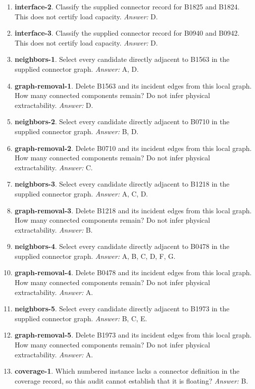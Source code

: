 \begin{enumerate}
\item \textbf{interface-2}. Classify the supplied connector record for B1825 and B1824. This does not certify load capacity. \textit{Answer:} D.
\item \textbf{interface-3}. Classify the supplied connector record for B0940 and B0942. This does not certify load capacity. \textit{Answer:} D.
\item \textbf{neighbors-1}. Select every candidate directly adjacent to B1563 in the supplied connector graph. \textit{Answer:} A, D.
\item \textbf{graph-removal-1}. Delete B1563 and its incident edges from this local graph. How many connected components remain? Do not infer physical extractability. \textit{Answer:} D.
\item \textbf{neighbors-2}. Select every candidate directly adjacent to B0710 in the supplied connector graph. \textit{Answer:} B, D.
\item \textbf{graph-removal-2}. Delete B0710 and its incident edges from this local graph. How many connected components remain? Do not infer physical extractability. \textit{Answer:} C.
\item \textbf{neighbors-3}. Select every candidate directly adjacent to B1218 in the supplied connector graph. \textit{Answer:} A, C, D.
\item \textbf{graph-removal-3}. Delete B1218 and its incident edges from this local graph. How many connected components remain? Do not infer physical extractability. \textit{Answer:} B.
\item \textbf{neighbors-4}. Select every candidate directly adjacent to B0478 in the supplied connector graph. \textit{Answer:} A, B, C, D, F, G.
\item \textbf{graph-removal-4}. Delete B0478 and its incident edges from this local graph. How many connected components remain? Do not infer physical extractability. \textit{Answer:} A.
\item \textbf{neighbors-5}. Select every candidate directly adjacent to B1973 in the supplied connector graph. \textit{Answer:} B, C, E.
\item \textbf{graph-removal-5}. Delete B1973 and its incident edges from this local graph. How many connected components remain? Do not infer physical extractability. \textit{Answer:} A.
\item \textbf{coverage-1}. Which numbered instance lacks a connector definition in the coverage record, so this audit cannot establish that it is floating? \textit{Answer:} B.

\end{enumerate}
